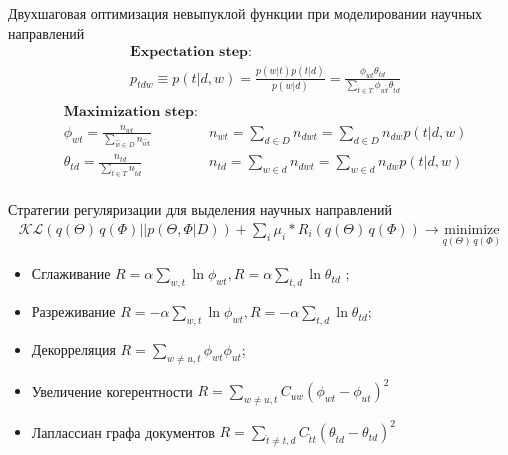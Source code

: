 \documentclass{beamer}
\begin{document}
\begin{frame}{Двухшаговая оптимизация невыпуклой функции при моделировании научных направлений}	
	\begin{align*}
		&\textbf{Expectation step:}  \\  		
		& p_{tdw} \equiv  p(t|d,w) = \frac{p(w|t) p(t|d)}{p(w|d)} = \frac{\phi_{wt} \theta_{td}}{\sum_{\hat{t} \in T}\phi_{w {\hat{t}}} \theta_{\hat{t} d}} \\
	\end{align*}
	\begin{align*}
		&\textbf{Maximization step:}   \\
		& \phi_{wt} = \frac{n_{wt}}{\sum_{\hat{w} \in D}n_{\hat{w}t}}  & n_{wt} = \sum_{d \in D} n_{dwt} = \sum_{d \in D} n_{dw} p(t|d,w) \\		
		& \theta_{td} = \frac{n_{td}}{\sum_{\hat{t} \in T} n_{\hat{t}d}}  & n_{td}  = \sum_{w \in d} n_{dwt} = \sum_{w \in d} n_{dw} p(t|d,w)  \\		
	\end{align*}
\end{frame}

\begin{frame}{Стратегии регуляризации для выделения научных направлений}
	\begin{align*}
		\mathcal{KL} (q(\Theta) \, q(\Phi) \vert \vert p \left( \Theta,\Phi \vert D \right) ) + \sum_i \mu_i * R_i(q(\Theta) \, q(\Phi)) \rightarrow \underset{q(\Theta) \, q(\Phi)} {\text{minimize}}				
	\end{align*}
	\begin{itemize}
	\item Сглаживание $R = \alpha \sum_{w,t} \ln \phi_{wt}, R= \alpha \sum_{t,d} \ln \theta_{td}$ ;
	\item Разреживание $R = - \alpha \sum_{w,t} \ln \phi_{wt}, R= - \alpha \sum_{t ,d} \ln \theta_{td}$;
	\item Декорреляция $ R = \sum_{w \ne u, t} \phi_{wt} \phi_{ut}$;
	\item Увеличение когерентности $R = \sum_{w \ne u, t} C_{uw} (\phi_{wt}-\phi_{ut})^2$
	\item Лаплассиан графа документов $R = \sum_{\hat{t} \ne t, d} C_{\hat{t}t} (\theta_{\hat{t} d}-\theta_{td})^2$
	\end{itemize}
\end{frame}

\end{document}
